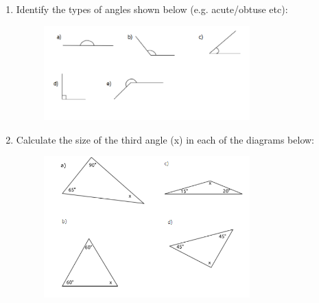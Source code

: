 \begin{enumerate}[noitemsep, label=\textbf{\arabic*}. ]
\begin{enumerate}[noitemsep, label=\textbf{\alph*}. ]
\begin{figure}[H]
\begin{center}
      \vspace{2pt}
    \vspace{.1in}
    \end{center}
 \end{figure}       \end{enumerate}
        \label{m39368*uid131}\item Identify the types of angles shown below (e.g. acute/obtuse etc):
    \setcounter{subfigure}{0}
	\begin{figure}[H] %
    \begin{center}
    \label{m39368*id401231!!!underscore!!!media}\label{m39368*id401231!!!underscore!!!printimage}\includegraphics[width=300px]{col11306.imgs/m39368_MG10C13_066.png} %
      \vspace{2pt}
    \vspace{.1in}
    \end{center}
 \end{figure}       
\label{m39368*uid140}\item Calculate the size of the third angle (x) in each of the diagrams below:
    \setcounter{subfigure}{0}
	\begin{figure}[H] %
    \begin{center}
    \label{m39368*id401232!!!underscore!!!media}\label{m39368*id401232!!!underscore!!!printimage}\includegraphics[width=300px]{col11306.imgs/m39368_MG10C13_067.png} %
      \vspace{2pt}
    \vspace{.1in}

\end{center}
\end{figure}
\end{enumerate}
